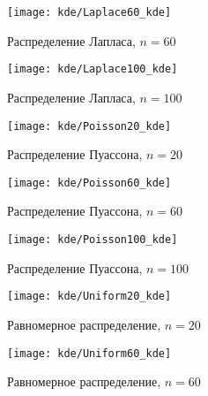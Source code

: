 \begin{figure}[H]
	\begin{center}
		\texttt{[image: kde/Laplace60\_kde]}
		\caption{Распределение Лапласа, $n=60$} 
		\label{pic:pic_name} 
	\end{center}
\end{figure}

\begin{figure}[H]
	\begin{center}
		\texttt{[image: kde/Laplace100\_kde]}
		\caption{Распределение Лапласа, $n=100$} 
		\label{pic:pic_name} 
	\end{center}
\end{figure}

\begin{figure}[H]
	\begin{center}
		\texttt{[image: kde/Poisson20\_kde]}
		\caption{Распределение Пуассона, $n=20$} 
		\label{pic:pic_name} 
	\end{center}
\end{figure}

\begin{figure}[H]
	\begin{center}
		\texttt{[image: kde/Poisson60\_kde]}
		\caption{Распределение Пуассона, $n=60$} 
		\label{pic:pic_name} 
	\end{center}
\end{figure}

\begin{figure}[H]
	\begin{center}
		\texttt{[image: kde/Poisson100\_kde]}
		\caption{Распределение Пуассона, $n=100$} 
		\label{pic:pic_name} 
	\end{center}
\end{figure}

\begin{figure}[H]
	\begin{center}
		\texttt{[image: kde/Uniform20\_kde]}
		\caption{Равномерное распределение, $n=20$} 
		\label{pic:pic_name} 
	\end{center}
\end{figure}

\begin{figure}[H]
	\begin{center}
		\texttt{[image: kde/Uniform60\_kde]}
		\caption{Равномерное распределение, $n=60$} 
		\label{pic:pic_name} 
	\end{center}
\end{figure}

